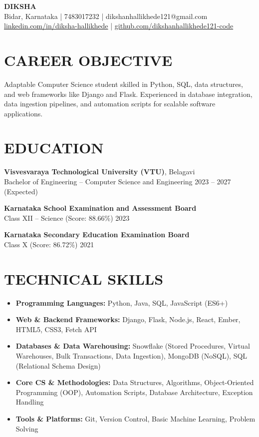 \documentclass{article}
\begin{document}
\begin{center}
    {\Huge \textbf{DIKSHA}} \\[6pt]
    Bidar, Karnataka | 7483017232 | dikshanhallikhede121@gmail.com \\
    \href{https://linkedin.com/in/diksha-hallikhede}{linkedin.com/in/diksha-hallikhede} | \href{https://github.com/dikshanhallikhede121-code}{github.com/dikshanhallikhede121-code}
\end{center}

\section*{CAREER OBJECTIVE}
Adaptable Computer Science student skilled in Python, SQL, data structures, and web frameworks like Django and Flask. Experienced in database integration, data ingestion pipelines, and automation scripts for scalable software applications.

\section*{EDUCATION}
\textbf{Visvesvaraya Technological University (VTU)}, Belagavi \\
Bachelor of Engineering – Computer Science and Engineering \hfill 2023 – 2027 (Expected)

\vspace{4pt}
\textbf{Karnataka School Examination and Assessment Board} \\
Class XII – Science (Score: 88.66\%) \hfill 2023

\vspace{4pt}
\textbf{Karnataka Secondary Education Examination Board} \\
Class X (Score: 86.72\%) \hfill 2021

\section*{TECHNICAL SKILLS}
\begin{itemize}[leftmargin==*, nosep]
    \item \textbf{Programming Languages:} Python, Java, SQL, JavaScript (ES6+)
    \item \textbf{Web \& Backend Frameworks:} Django, Flask, Node.js, React, Ember, HTML5, CSS3, Fetch API
    \item \textbf{Databases \& Data Warehousing:} Snowflake (Stored Procedures, Virtual Warehouses, Bulk Transactions, Data Ingestion), MongoDB (NoSQL), SQL (Relational Schema Design)
    \item \textbf{Core CS \& Methodologies:} Data Structures, Algorithms, Object-Oriented Programming (OOP), Automation Scripts, Database Architecture, Exception Handling
    \item \textbf{Tools \& Platforms:} Git, Version Control, Basic Machine Learning, Problem Solving
\end{itemize}
\end{document}
